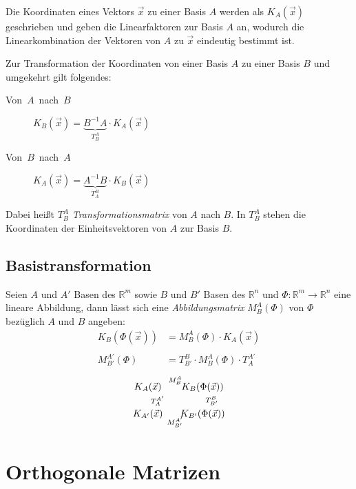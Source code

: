 Die Koordinaten eines Vektors $\vec{x}$ zu einer Basis $A$ werden als $K_A(\vec{x})$ geschrieben und geben die Linearfaktoren zur Basis $A$ an, wodurch die Linearkombination der Vektoren von $A$ zu $\vec{x}$ eindeutig bestimmt ist.

Zur Transformation der Koordinaten von einer Basis $A$ zu einer Basis $B$ und umgekehrt gilt folgendes:
\begin{description}
  \item [{Von~$A$~nach~$B$}] $K_{B}(\vec{x})=\underbrace{B^{-1}A}_{T_{B}^{A}}\cdot K_{A}(\vec{x})$
  \item [{Von~$B$~nach~$A$}] $K_{A}(\vec{x})=\underbrace{A^{-1}B}_{T_{A}^{B}}\cdot K_{B}(\vec{x})$
\end{description}
Dabei heißt $T_{B}^{A}$ \emph{Transformationsmatrix} von $A$ nach $B$. In $T_{B}^{A}$ stehen die Koordinaten der Einheitsvektoren von $A$ zur Basis $B$.


\subsection{Basistransformation}

Seien $A$ und $A'$ Basen des $\mathbb{R}^{m}$ sowie $B$ und $B'$ Basen des $\mathbb{R}^{n}$ und $\Phi:\mathbb{R}^{m}\to\mathbb{R}^{n}$ eine lineare Abbildung, dann lässt sich eine \emph{Abbildungsmatrix} $M_{B}^{A}(\Phi)$ von $\Phi$ bezüglich $A$ und $B$ angeben:
\begin{align*}
  K_B(\Phi(\vec{x})) & = M_B^A(\Phi)\cdot K_A(\vec{x})\\
  \\
  M_{B'}^{A'}(\Phi)  & = T_{B'}^B\cdot M_B^A(\Phi)\cdot T_A^{A'}
\end{align*}
\[
  \xySep{12pt}\vcenter{\xymatrix{
    K_A(\vec{x})\ar@{->}[r]^{M_B^A}                                & K_B(\Phi(\vec{x}))\ar@{->}[d]^{T_{B'}^B}\\
    K_{A'}(\vec{x})\ar@{->}[u]_{T_A^{A'}}\ar@{->}[r]_{M_{B'}^{A'}} & K_{B'}(\Phi(\vec{x}))
  }}
\]



\section{\label{sec:Orthogonale-Matrizen}Orthogonale Matrizen}

